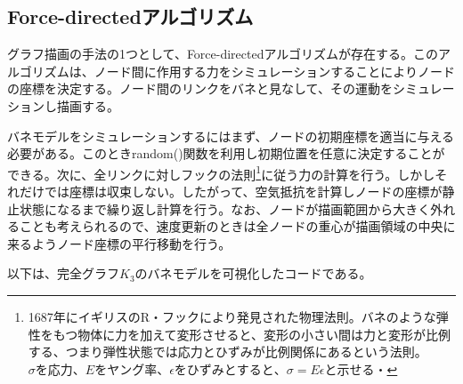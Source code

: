 \documentclass[dvipdfmx]{jsarticle}
\begin{document}
\subsection{Force-directedアルゴリズム}
グラフ描画の手法の1つとして、Force-directedアルゴリズムが存在する。このアルゴリズムは、ノード間に作用する力をシミュレーションすることによりノードの座標を決定する。ノード間のリンクをバネと見なして、その運動をシミュレーションし描画する。\par
バネモデルをシミュレーションするにはまず、ノードの初期座標を適当に与える必要がある。このときrandom()関数を利用し初期位置を任意に決定することができる。次に、全リンクに対しフックの法則\footnote{1687年にイギリスのR・フックにより発見された物理法則。バネのような弾性をもつ物体に力を加えて変形させると、変形の小さい間は力と変形が比例する、つまり弾性状態では応力とひずみが比例関係にあるという法則。$\sigma を応力、Eをヤング率、\epsilon をひずみとすると、\sigma = E\epsilon$と示せる・}に従う力の計算を行う。しかしそれだけでは座標は収束しない。したがって、空気抵抗を計算しノードの座標が静止状態になるまで繰り返し計算を行う。なお、ノードが描画範囲から大きく外れることも考えられるので、速度更新のときは全ノードの重心が描画領域の中央に来るようノード座標の平行移動を行う。\par
以下は、完全グラフ$K_{3}$のバネモデルを可視化したコードである。
\end{document}
